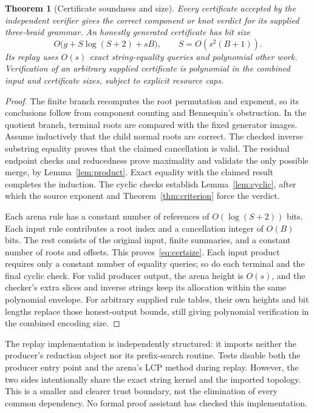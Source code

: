 \documentclass[11pt,letterpaper]{article}
\newtheorem{theorem}{Theorem}[section]
\theoremstyle{definition}\newtheorem{definition}[theorem]{Definition}
\theoremstyle{remark}\newtheorem{remark}[theorem]{Remark}
\begin{document}
\begin{theorem}[Certificate soundness and size]\label{thm:certificate}
Every certificate accepted by the independent verifier gives the correct component or knot verdict for its supplied three-braid grammar. An honestly generated certificate has bit size
\begin{equation}\label{eq:certsize}
 O\bigl(g+S\log(S+2)+sB\bigr),\qquad S=O(s^2(B+1)).
\end{equation}
Its replay uses $O(s)$ exact string-equality queries and polynomial other work. Verification of an arbitrary supplied certificate is polynomial in the combined input and certificate sizes, subject to explicit resource caps.
\end{theorem}
\begin{proof}
The finite branch recomputes the root permutation and exponent, so its conclusions follow from component counting and Bennequin's obstruction. In the quotient branch, terminal roots are compared with the fixed generator images. Assume inductively that the child normal roots are correct. The checked inverse substring equality proves that the claimed cancellation is valid. The residual endpoint checks and reducedness prove maximality and validate the only possible merge, by Lemma~\ref{lem:product}. Exact equality with the claimed result completes the induction. The cyclic checks establish Lemma~\ref{lem:cyclic}, after which the source exponent and Theorem~\ref{thm:criterion} force the verdict.

Each arena rule has a constant number of references of $O(\log(S+2))$ bits. Each input rule contributes a root index and a cancellation integer of $O(B)$ bits. The rest consists of the original input, finite summaries, and a constant number of roots and offsets. This proves~\eqref{eq:certsize}. Each input product requires only a constant number of equality queries; so do each terminal and the final cyclic check. For valid producer output, the arena height is $O(s)$, and the checker's extra slices and inverse strings keep its allocation within the same polynomial envelope. For arbitrary supplied rule tables, their own heights and bit lengths replace those honest-output bounds, still giving polynomial verification in the combined encoding size.
\end{proof}

The replay implementation is independently structured: it imports neither the producer's reduction object nor its prefix-search routine. Tests disable both the producer entry point and the arena's LCP method during replay. However, the two sides intentionally share the exact string kernel and the imported topology. This is a smaller and clearer trust boundary, not the elimination of every common dependency. No formal proof assistant has checked this implementation.
\end{document}
